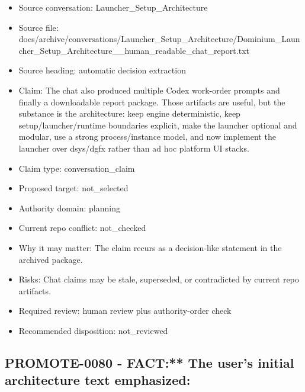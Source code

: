 \documentclass[11pt,a4paper]{report}
\begin{document}
\begin{itemize}
\item Source conversation: Launcher\_Setup\_Architecture
\item Source file: docs/archive/conversations/Launcher\_Setup\_Architecture/Dominium\_Launcher\_Setup\_Architecture\_\_human\_readable\_chat\_report.txt
\item Source heading: automatic decision extraction
\item Claim: The chat also produced multiple Codex work-order prompts and finally a downloadable report package. Those artifacts are useful, but the substance is the architecture: keep engine deterministic, keep setup/launcher/runtime boundaries explicit, make the launcher optional and modular, use a strong process/instance model, and now implement the launcher over dsys/dgfx rather than ad hoc platform UI stacks.
\item Claim type: conversation\_claim
\item Proposed target: not\_selected
\item Authority domain: planning
\item Current repo conflict: not\_checked
\item Why it may matter: The claim recurs as a decision-like statement in the archived package.
\item Risks: Chat claims may be stale, superseded, or contradicted by current repo artifacts.
\item Required review: human review plus authority-order check
\item Recommended disposition: not\_reviewed
\end{itemize}

\subsection{PROMOTE-0080 - FACT:** The user's initial architecture text emphasized:}
\end{document}
